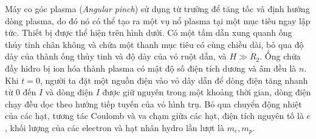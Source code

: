 Máy co góc plasma (\textit{Angular pinch}) sử dụng từ trường để tăng tốc và định hướng dòng plasma, do đó nó có thể tạo ra một vụ nổ plasma tại một mục tiêu ngay lập tức. Thiết bị được thể hiện trên hình dưới. Có một tấm dẫn xung quanh ống thủy tinh chân không và chứa một thanh mục tiêu có cùng chiều dài, bỏ qua độ dày của thành ống thủy tinh và độ dày của vỏ ruột dẫn, và $ H \gg R_{ 2} $. Ống chứa đầy hiđro bị ion hóa thành plasma có mật độ số điện tích dương và âm đều là $n$. Khi $ t = 0 $, người ta đặt một nguồn điện vào vỏ dây dẫn để dòng điện tăng nhanh từ 0 đến $ I $ và dòng điện $ I $ được giữ nguyên trong một khoảng thời gian, dòng điện chạy đều dọc theo hướng tiếp tuyến của vỏ hình trụ. Bỏ qua chuyển động nhiệt của các hạt, tương tác Coulomb và va chạm giữa các hạt, điện tích nguyên tố là $ e $, khối lượng của các electron và hạt nhân hydro lần lượt là $ m_{e}, m_{p} $.

